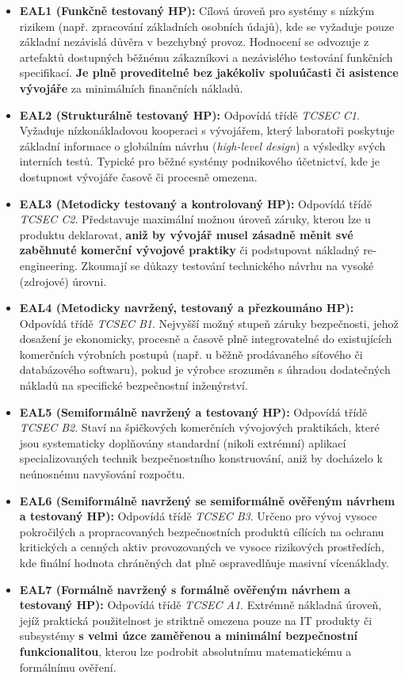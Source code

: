 \documentclass[10pt,a4paper]{article}
\begin{document}
	\begin{itemize}
		\item \textbf{EAL1 (Funkčně testovaný HP):} Cílová úroveň pro systémy s nízkým rizikem (např. zpracování základních osobních údajů), kde se vyžaduje pouze základní nezávislá důvěra v bezchybný provoz. Hodnocení se odvozuje z artefaktů dostupných běžnému zákazníkovi a nezávislého testování funkčních specifikací. \textbf{Je plně proveditelné bez jakékoliv spoluúčasti či asistence vývojáře} za minimálních finančních nákladů.
		
		\item \textbf{EAL2 (Strukturálně testovaný HP):} Odpovídá třídě \textit{TCSEC C1}. Vyžaduje nízkonákladovou kooperaci s vývojářem, který laboratoři poskytuje základní informace o globálním návrhu (\textit{high-level design}) a výsledky svých interních testů. Typické pro běžné systémy podnikového účetnictví, kde je dostupnost vývojáře časově či procesně omezena.
	
		\item \textbf{EAL3 (Metodicky testovaný a kontrolovaný HP):} Odpovídá třídě \textit{TCSEC C2}. Představuje maximální možnou úroveň záruky, kterou lze u produktu deklarovat, \textbf{aniž by vývojář musel zásadně měnit své zaběhnuté komerční vývojové praktiky} či podstupovat nákladný re-engineering. Zkoumají se důkazy testování technického návrhu na vysoké (zdrojové) úrovni.

		\item \textbf{EAL4 (Metodicky navržený, testovaný a přezkoumáno HP):} Odpovídá třídě \textit{TCSEC B1}. Nejvyšší možný stupeň záruky bezpečnosti, jehož dosažení je ekonomicky, procesně a časově plně integrovatelné do existujících komerčních výrobních postupů (např. u běžně prodávaného síťového či databázového softwaru), pokud je výrobce srozuměn s úhradou dodatečných nákladů na specifické bezpečnostní inženýrství.
		
		\item \textbf{EAL5 (Semiformálně navržený a testovaný HP):} Odpovídá třídě \textit{TCSEC B2}. Staví na špičkových komerčních vývojových praktikách, které jsou systematicky doplňovány standardní (nikoli extrémní) aplikací specializovaných technik bezpečnostního konstruování, aniž by docházelo k neúnosnému navyšování rozpočtu.

		\item \textbf{EAL6 (Semiformálně navržený se semiformálně ověřeným návrhem a testovaný HP):} Odpovídá třídě \textit{TCSEC B3}. Určeno pro vývoj vysoce pokročilých a propracovaných bezpečnostních produktů cílících na ochranu kritických a cenných aktiv provozovaných ve vysoce rizikových prostředích, kde finální hodnota chráněných dat plně ospravedlňuje masivní vícenáklady.

		\item \textbf{EAL7 (Formálně navržený s formálně ověřeným návrhem a testovaný HP):} Odpovídá třídě \textit{TCSEC A1}. Extrémně nákladná úroveň, jejíž praktická použitelnost je striktně omezena pouze na IT produkty či subsystémy \textbf{s velmi úzce zaměřenou a minimální bezpečnostní funkcionalitou}, kterou lze podrobit absolutnímu matematickému a formálnímu ověření.
	\end{itemize}
			
\end{document}
